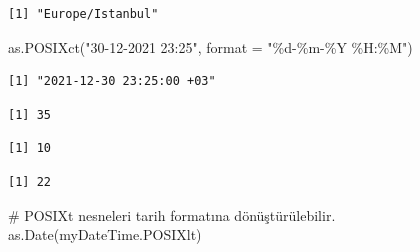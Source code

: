 \documentclass[
  letterpaper,
  DIV=11,
  numbers=noendperiod]{scrreprt}
\newenvironment{Shaded}{\begin{snugshade}}{\end{snugshade}}
\newcommand{\AttributeTok}[1]{\textcolor[rgb]{0.40,0.45,0.13}{#1}}
\newcommand{\CommentTok}[1]{\textcolor[rgb]{0.37,0.37,0.37}{#1}}
\newcommand{\FunctionTok}[1]{\textcolor[rgb]{0.28,0.35,0.67}{#1}}
\newcommand{\NormalTok}[1]{\textcolor[rgb]{0.00,0.23,0.31}{#1}}
\newcommand{\OtherTok}[1]{\textcolor[rgb]{0.00,0.23,0.31}{#1}}
\newcommand{\SpecialCharTok}[1]{\textcolor[rgb]{0.37,0.37,0.37}{#1}}
\newcommand{\StringTok}[1]{\textcolor[rgb]{0.13,0.47,0.30}{#1}}
\begin{document}
\begin{verbatim}
[1] "Europe/Istanbul"
\end{verbatim}

\begin{Shaded}
\begin{Highlighting}[]
\FunctionTok{as.POSIXct}\NormalTok{(}\StringTok{"30{-}12{-}2021 23:25"}\NormalTok{, }\AttributeTok{format =} \StringTok{"\%d{-}\%m{-}\%Y \%H:\%M"}\NormalTok{)}
\end{Highlighting}
\end{Shaded}

\begin{verbatim}
[1] "2021-12-30 23:25:00 +03"
\end{verbatim}

\begin{Shaded}
\end{Shaded}

\begin{verbatim}
[1] 35
\end{verbatim}

\begin{Shaded}
\end{Shaded}

\begin{verbatim}
[1] 10
\end{verbatim}

\begin{Shaded}
\end{Shaded}

\begin{verbatim}
[1] 22
\end{verbatim}

\begin{Shaded}
\begin{Highlighting}[]
\CommentTok{\# POSIXt nesneleri tarih formatına dönüştürülebilir.}
\FunctionTok{as.Date}\NormalTok{(myDateTime.POSIXlt)}
\end{Highlighting}
\end{Shaded}
\end{document}

